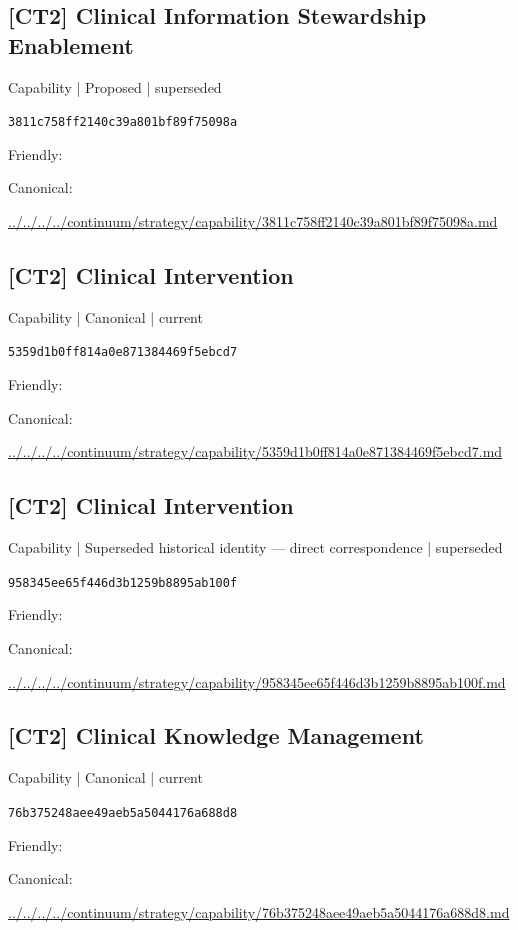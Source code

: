 \documentclass[10pt,a4paper]{article}
\begin{document}
\subsection*{[CT2] Clinical Information Stewardship Enablement}
{\small Capability | Proposed | superseded}\par
\texttt{3811c758ff2140c39a801bf89f75098a}\par
Friendly: \par
Canonical: \par
{\footnotesize\url{../../../../continuum/strategy/capability/3811c758ff2140c39a801bf89f75098a.md}}\par
\subsection*{[CT2] Clinical Intervention}
{\small Capability | Canonical | current}\par
\texttt{5359d1b0ff814a0e871384469f5ebcd7}\par
Friendly: \par
Canonical: \par
{\footnotesize\url{../../../../continuum/strategy/capability/5359d1b0ff814a0e871384469f5ebcd7.md}}\par
\subsection*{[CT2] Clinical Intervention}
{\small Capability | Superseded historical identity — direct correspondence | superseded}\par
\texttt{958345ee65f446d3b1259b8895ab100f}\par
Friendly: \par
Canonical: \par
{\footnotesize\url{../../../../continuum/strategy/capability/958345ee65f446d3b1259b8895ab100f.md}}\par
\subsection*{[CT2] Clinical Knowledge Management}
{\small Capability | Canonical | current}\par
\texttt{76b375248aee49aeb5a5044176a688d8}\par
Friendly: \par
Canonical: \par
{\footnotesize\url{../../../../continuum/strategy/capability/76b375248aee49aeb5a5044176a688d8.md}}\par
\end{document}
